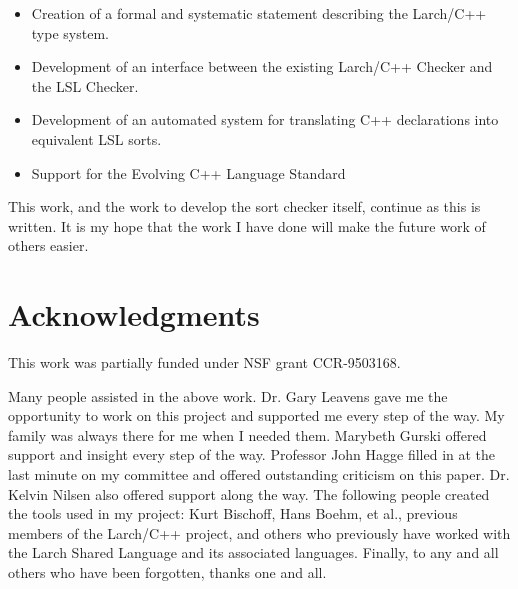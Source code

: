 \documentclass[12pt]{article} %
\begin{document}
\begin{itemize}

\item Creation of a formal and systematic statement describing the
Larch/C++ type system.

\item Development of an interface between the existing Larch/C++ Checker and
the LSL Checker.

\item Development of an automated system for translating C++
declarations into equivalent LSL sorts.

\item Support for the Evolving C++ Language Standard

\end{itemize}

This work, and the work to develop the sort checker itself, continue
as this is written. It is my hope that the work I have done will make
the future work of others easier.

\section{Acknowledgments}
\label{ack}
This work was partially funded under NSF grant CCR-9503168.

Many people assisted in the above work. Dr. Gary Leavens gave me the
opportunity to work on this project and supported me
every step of the way. My family was always there for me when I needed them.
Marybeth Gurski offered support and insight every step of the way. Professor
John Hagge filled in at the last minute on my committee and offered
outstanding criticism on this paper. Dr. Kelvin Nilsen also offered support
along the way. The following people created the tools used in my project: 
Kurt Bischoff, Hans Boehm, et al., previous members of the Larch/C++
project, and others who previously have worked with the Larch Shared
Language and its associated languages. Finally, to any and all others who have
been forgotten, thanks one and all.


\end{document}

